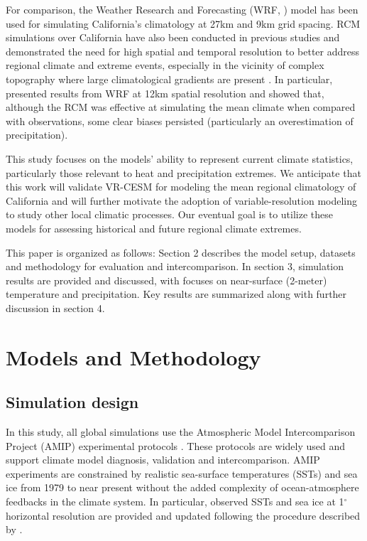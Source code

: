 \documentclass[draft,ms]{agutex}   %
\begin{document}
\begin{article}
For comparison, the Weather Research and Forecasting (WRF, \cite{skamarock2005coauthors}) model has been used for simulating California's climatology at 27km and 9km grid spacing. RCM simulations over California have also been conducted in previous studies and demonstrated the need for high spatial and temporal resolution to better address regional climate and extreme events, especially in the vicinity of complex topography where large climatological gradients are present \citep{leung2004mid, kanamitsu2007fifty, caldwell2009evaluation, pan2011influences, pierce2013probabilistic}. In particular, \cite{caldwell2009evaluation} presented results from WRF at 12km spatial resolution and showed that, although the RCM was effective at simulating the mean climate when compared with observations, some clear biases persisted (particularly an overestimation of precipitation).

This study focuses on the models' ability to represent current climate statistics, particularly those relevant to heat and precipitation extremes. We anticipate that this work will validate VR-CESM for modeling the mean regional climatology of California and will further motivate the adoption of variable-resolution modeling to study other local climatic processes. Our eventual goal is to utilize these models for assessing historical and future regional climate extremes.


This paper is organized as follows: Section 2 describes the model setup, datasets and methodology for evaluation and intercomparison. In section 3, simulation results are provided and discussed, with focuses on near-surface (2-meter) temperature and precipitation. Key results are summarized along with further discussion in section 4.


\section{Models and Methodology}

\subsection{Simulation design} 

In this study, all global simulations use the Atmospheric Model Intercomparison Project (AMIP) experimental protocols \citep{Gates1992}. These protocols are widely used and support climate model diagnosis, validation and intercomparison. AMIP experiments are constrained by realistic sea-surface temperatures (SSTs) and sea ice from 1979 to near present without the added complexity of ocean-atmosphere feedbacks in the climate system. In particular, observed SSTs and sea ice at 1$^\circ$ horizontal resolution are provided and updated following the procedure described by \citep{hurrell2008new}.


\end{article}
\end{document}
